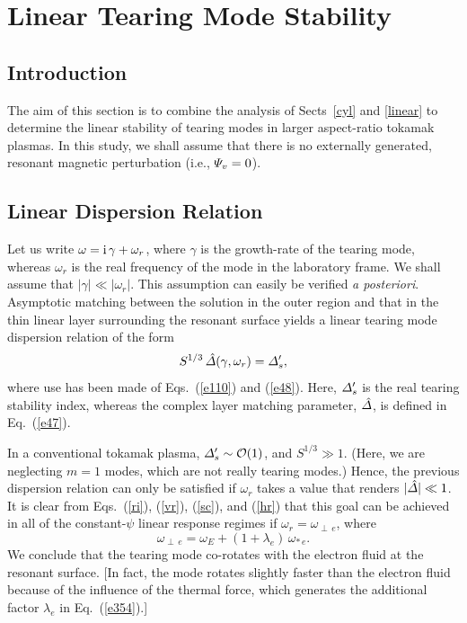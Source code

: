 \documentclass[12pt,prb,aps]{revtex4-1}
\begin{document}
\section{Linear Tearing Mode Stability}\label{stab}
\subsection{Introduction}
The aim of this section is to combine the analysis of Sects~\ref{cyl} and \ref{linear} to determine the linear stability
of tearing modes in larger aspect-ratio  tokamak plasmas. In this study, we shall assume that there is no externally generated, resonant
magnetic perturbation (i.e., ${\mit\Psi}_v=0$). 

\subsection{Linear Dispersion Relation}\label{s6.2}
Let us write
$\omega = {\rm i}\,\gamma+\omega_r$, where $\gamma$ is the growth-rate of the tearing mode, whereas $\omega_r$ is the real
frequency of the mode in the laboratory frame. We shall assume that $|\gamma|\ll |\omega_r|$. This assumption can
easily be verified {\em a posteriori}. Asymptotic matching between the solution in the outer region and that in the
thin linear layer surrounding the resonant surface yields a linear tearing mode dispersion relation of the form
\begin{equation}\label{e352}
S^{1/3}\,\hat{\mit\Delta}(\gamma,\omega_r) = {\mit\Delta}_s',
\end{equation}
where use has been made of Eqs.~(\ref{e110}) and (\ref{e48}). Here, ${\mit\Delta}_s'$ is the real tearing stability index, 
whereas the complex layer matching parameter, $\hat{\mit\Delta}$, is defined in Eq.~(\ref{e47}). 

In a conventional tokamak plasma, ${\mit\Delta}_s' \sim {\cal O}(1)$, and $S^{1/3}\gg 1$. (Here, we are neglecting $m=1$ modes, which
are not really tearing modes.)
Hence, the previous dispersion relation can only be satisfied if $\omega_r$ takes a
value that renders $|\hat{\mit\Delta}|\ll 1$. It is clear from Eqs.~(\ref{ri}), (\ref{vr}), (\ref{sc}), and (\ref{hr}) that this goal
can be achieved in all of the constant-$\psi$ linear response regimes if
$\omega_r = \omega_{\perp\,e}$, where
\begin{equation}\label{e354}
\omega_{\perp\,e} = \omega_E+(1+\lambda_e)\,\omega_{\ast\,e}.
\end{equation}
We conclude that the tearing mode co-rotates with the electron fluid at the resonant
 surface.\cite{ara} [In fact, the mode 
rotates slightly faster than the electron fluid because of the influence of the thermal force, 
which generates the additional  factor $\lambda_e$ in Eq.~(\ref{e354}).]
\end{document}
